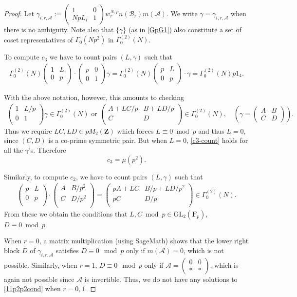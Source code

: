 \documentclass[11pt]{amsart}
\numberwithin{equation}{section}
\theoremstyle{plain}
\theoremstyle{definition}
\newcommand{\z}{\mf Z}
\newcommand{\mf}{\mathbf}
\newcommand{\mc}{\mathcal}
\newcommand{\mrm}{\mathrm}
\newcommand{\q}{\quad}
\newcommand{\psmb}{\left( \begin{smallmatrix}}
\newcommand{\psme}{ \end{smallmatrix} \right) }
\newcommand{\smat}[4]{\left( \begin{smallmatrix}#1&#2\\#3&#4\end{smallmatrix}\right)}
\newcommand{\pmat}[4]{\begin{pmatrix} #1 & #2 \\ #3 & #4 \\ \end{pmatrix} }
\newcommand{\GL}{\mrm{GL}}
\begin{document}
\begin{proof}
Let $\gamma_{i,r,\mc A}:=\smat{1}{0}{NpL_i}{1}w_r^{N,p} n(\mc B_r)m( \mc A)$. We write $\gamma= \gamma_{i,r,\mc A}$ when there is no ambiguity. Note also that $\{ \gamma \}$ (as in \eqref{GpG1}) also constitute a set of coset representatives of $\Gamma_0(Np^2)$ in $\Gamma^{(2)}_0(N)$.

To compute $c_3$ we have to count pairs $(L, \gamma)$ such that 
\begin{align} \label{c3-count}
\Gamma^{(2)}_0(N)\psmb 1 & L \\ 0 & p \psme \cdot \psmb p & 0 \\ 0 & 1 \psme \gamma = \Gamma^{(2)}_0(N)\psmb p & L \\ 0 & p \psme \cdot \gamma= \Gamma^{(2)}_0(N) p 1_4.
\end{align}

With the above notation, however, this amounts to checking
\begin{align}
    \pmat{1}{L/p}{0}{1} \gamma \in \Gamma^{(2)}_0(N) \text{ or } \pmat{A+L C/p}{B + LD/p}{C}{D} \in \Gamma^{(2)}_0(N),  \q (\gamma = \psmb A & B\\ C & D \psme).
\end{align}
Thus we require $\displaystyle LC, LD\in p M_2(\z)$ which forces $L \equiv 0 \bmod p$ and thus $L=0$, since $(C,D)$ is a co-prime symmetric pair. But when $L=0$, \eqref{c3-count} holds for all the $\gamma$'s. Therefore
\begin{equation}
    c_3 = \mu(p^2).
\end{equation}

Similarly, to compute $c_2$, we have to count pairs $(L, \gamma)$ such that 
\begin{align}\label{11p2p2cond}
     \pmat{p}{L}{0}{p} \cdot \pmat{A}{B/p^2}{C}{D/p^2} = \pmat{pA+LC}{B/p+LD/p^2}{pC}{D/p} \in \Gamma^{(2)}_0(N).
\end{align}
From these we obtain the conditions that $L,C \bmod p \in \GL_2(\mf F_p)$, $D \equiv 0 \bmod p$. 

When $r=0$, a matrix multiplication (using SageMath) shows that the lower right block $D$ of $\gamma_{i,r, \mc A}$ satisfies $D\equiv 0 \mod p$ only if $m(\mc A)=0$, which is not possible. Similarly,  when $r=1$, $D\equiv 0 \mod p$ only if $\mc A=\smat{0}{0}{*}{*}$, which is again not possible since $\mc A$ is invertible. Thus, we do not have any solutions to \eqref{11p2p2cond} when $r=0,1$.


\end{proof}
\end{document}
